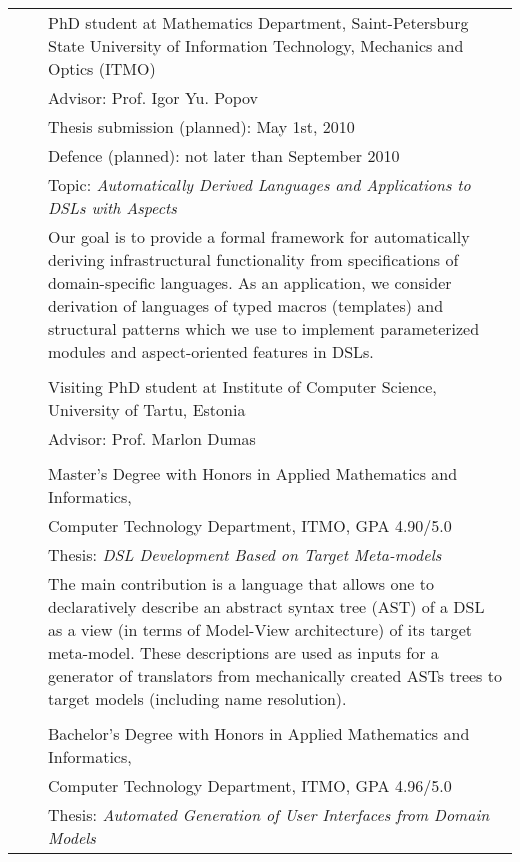 \documentclass[a4paper, 12pt]{article}
\begin{document}
\begin{tabular*}{1.0\textwidth}[t]{p{70pt} l p{370pt}}
	\raggedleft{since 2007}&\hspace{10pt}&PhD student at Mathematics Department, Saint-Petersburg State University of Information Technology, Mechanics and Optics (ITMO)\\
	&&Advisor: Prof. Igor Yu. Popov \\
	&&Thesis submission (planned): May 1st, 2010\\
	&&Defence (planned): not later than September 2010\\
	&&Topic: \textit{Automatically Derived Languages and Applications to DSLs with Aspects}\\
	&&Our goal is to provide a formal framework for automatically deriving infrastructural functionality 
	  from specifications of domain-specific languages.
	  As an application, we consider derivation of languages of typed macros (templates) and structural patterns
	  which we use to implement parameterized modules and aspect-oriented features in DSLs. \\
	&&\\
	\raggedleft{2009 -- 2010}&& Visiting PhD student at Institute of Computer Science, University of Tartu, Estonia\\
	&&Advisor: Prof. Marlon Dumas \\
	&&\\
	\raggedleft{2007} && Master's Degree with Honors in Applied Mathematics and Informatics, \\
	&&Computer Technology Department, ITMO, GPA 4.90/5.0\\
	&&Thesis: \textit{DSL Development Based on Target Meta-models}\\
	&&The main contribution is a language that allows one to declaratively describe an abstract syntax tree (AST) of a 
	  DSL as a view (in terms of Model-View architecture) of its target meta-model. These descriptions are
	  used as inputs for a generator of translators from mechanically created ASTs trees to target models 
	  (including name resolution). \\
	&&\\
	\raggedleft{2005} && Bachelor's Degree with Honors in Applied Mathematics and Informatics, \\
	&&Computer Technology Department, ITMO, GPA 4.96/5.0\\
	&&Thesis: \textit{Automated Generation of User Interfaces from Domain Models}\\
\end{tabular*}
\end{document}
